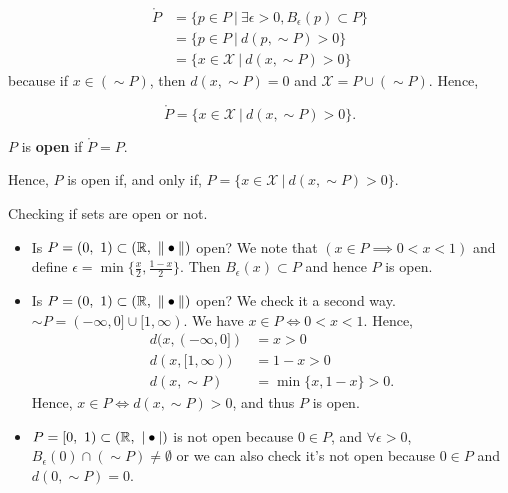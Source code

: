 \begin{rem} \mbox{ }
\begin{align*}
    \mathring{P} & = \{ p \in P~ |~ \exists \epsilon >0, B_\epsilon(p) \subset P\} \\
        & = \{ p \in P~ |~ d(p, \sim P) >0\} \\
        & =  \{ x \in \mathcal{X}~ |~ d(x, \sim P) >0\}
\end{align*}
because if $x \in (\sim P)$, then $d(x, \sim P)=0$ and $\mathcal{X} = P \cup (\sim P)$. Hence, 
\begin{center}
 $$ \boxed{\mathring{P} = \{ x \in \mathcal{X}~|~ d(x, \sim P) > 0 \}.}$$
\end{center}
\end{rem}

\begin{definition} $P$ is \textbf{open} if $\mathring{P} =P$.
\end{definition}

\begin{rem} Hence, $P$ is open if, and only if, $P= \{ x \in \mathcal{X}~|~ d(x, \sim P) > 0 \}$.

\end{rem}
    

\begin{example} Checking if sets are open or not.
\begin{itemize}
        \item Is $P=(0,\ 1)\subset(\mathbb R,\ \| \bullet \|)$ open? We note that $(x \in P \implies  0 < x < 1)$ and define $\epsilon = \min\{\frac{x}{2}, \frac{1-x}{2}\} $. Then $B_\epsilon(x) \subset P$ and hence $P$ is open.\\
        
        \item  Is $P=(0,\ 1)\subset(\mathbb R,\ \| \bullet \|)$ open? We check it a second  way. $\sim P = (-\infty, 0] \cup [1, \infty)$. We have $x \in P \iff 0 < x < 1$. Hence, 
        \begin{align*}
                d(x, (-\infty, 0])&=x>0\\
                d(x,  [1, \infty))&=1-x>0\\
                d(x, \sim P) &= \min\{x, 1-x\} > 0.
        \end{align*}
            Hence, $x \in P \iff d(x, \sim P) >0$, and thus $P$ is open.
        \item $P=[0,\ 1)\subset(\mathbb R,\ |  \bullet |)$ is not open because $0\in P$, and $\forall\epsilon>0$, $B_\epsilon(0)\cap(\sim P)\neq\emptyset$ or we can also check it's not open because $0\in P$ and $d(0, \sim P)=0$.
    \end{itemize}

    
\end{example}
    
